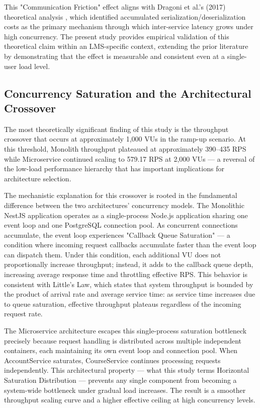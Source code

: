 This "Communication Friction" effect aligns with Dragoni et al.'s (2017) theoretical analysis \cite{Nicola_Dragoni}, which identified accumulated serialization/deserialization costs as the primary mechanism through which inter-service latency grows under high concurrency. The present study provides empirical validation of this theoretical claim within an LMS-specific context, extending the prior literature by demonstrating that the effect is measurable and consistent even at a single-user load level.

\subsection{Concurrency Saturation and the Architectural Crossover}

The most theoretically significant finding of this study is the throughput crossover that occurs at approximately 1,000 VUs in the ramp-up scenario. At this threshold, Monolith throughput plateaued at approximately 390–435 RPS while Microservice continued scaling to 579.17 RPS at 2,000 VUs — a reversal of the low-load performance hierarchy that has important implications for architecture selection.

The mechanistic explanation for this crossover is rooted in the fundamental difference between the two architectures' concurrency models. The Monolithic NestJS application operates as a single-process Node.js application sharing one event loop and one PostgreSQL connection pool. As concurrent connections accumulate, the event loop experiences "Callback Queue Saturation" — a condition where incoming request callbacks accumulate faster than the event loop can dispatch them. Under this condition, each additional VU does not proportionally increase throughput; instead, it adds to the callback queue depth, increasing average response time and throttling effective RPS. This behavior is consistent with Little's Law, which states that system throughput is bounded by the product of arrival rate and average service time: as service time increases due to queue saturation, effective throughput plateaus regardless of the incoming request rate.

The Microservice architecture escapes this single-process saturation bottleneck precisely because request handling is distributed across multiple independent containers, each maintaining its own event loop and connection pool. When AccountService saturates, CourseService continues processing requests independently. This architectural property — what this study terms Horizontal Saturation Distribution — prevents any single component from becoming a system-wide bottleneck under gradual load increases. The result is a smoother throughput scaling curve and a higher effective ceiling at high concurrency levels.

